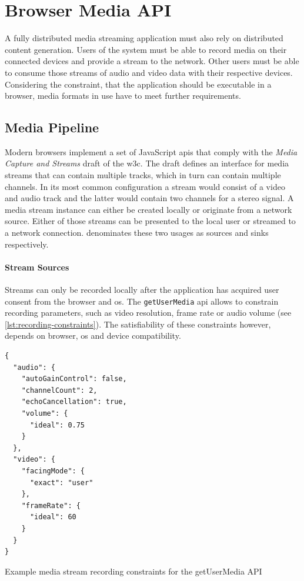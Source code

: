 \section{Browser Media API}

A fully distributed media streaming application must also rely on distributed content generation. Users of the system must be able to record media on their connected devices and provide a stream to the network. Other users must be able to consume those streams of audio and video data with their respective devices. Considering the constraint, that the application should be executable in a browser, media formats in use have to meet further requirements.

\subsection{Media Pipeline}\label{browser-api}

Modern browsers implement a set of JavaScript \glspl{api} that comply with the {\textit{Media Capture and Streams}} draft \citep{media-capture-and-streams} of the \gls{w3c}. The draft defines an interface for media streams that can contain multiple tracks, which in turn can contain multiple channels. In its most common configuration a stream would consist of a video and audio track and the latter would contain two channels for a stereo signal. A media stream instance can either be created locally or originate from a network source. Either of those streams can be presented to the local user or streamed to a network connection. \citet{media-capture-and-streams} denominates these two usages as sources and sinks respectively.

\paragraph{Stream Sources}
Streams can only be recorded locally after the application has acquired user consent from the browser and \gls{os}. The \lstinline|getUserMedia| \gls{api} \cite{get-user-media} allows to constrain recording parameters, such as video resolution, frame rate or audio volume (see \ref{lst:recording-constraints}). The satisfiability of these constraints however, depends on browser, \gls{os} and device compatibility.

\begin{Listing}
\begin{lstlisting}
{
  "audio": {
    "autoGainControl": false,
    "channelCount": 2,
    "echoCancellation": true,
    "volume": {
      "ideal": 0.75
    }
  },
  "video": {
    "facingMode": {
      "exact": "user"
    },
    "frameRate": {
      "ideal": 60
    }
  }
}
\end{lstlisting}
\caption{Example media stream recording constraints for the getUserMedia API}
\label{lst:recording-constraints}
\end{Listing}


